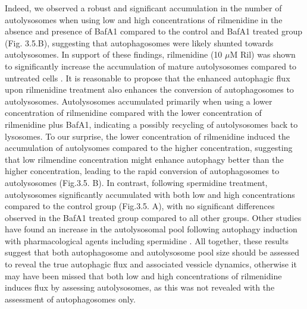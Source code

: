 {%
Indeed, we observed a robust and significant accumulation in the number of autolysosomes when using low and high concentrations of rilmenidine in the absence and presence of BafA1 compared to the control and BafA1 treated group (Fig. 3.5.B), suggesting that autophagosomes were likely shunted towards autolysosomes. In support of these findings,  rilmenidine (10 $\mu$M Ril) was shown to significantly increase the accumulation of mature autolysosomes compared to untreated cells \citep{Perera2018}. It is reasonable to propose that the enhanced autophagic flux upon rilmenidine treatment  also enhances the conversion of autophagosomes to autolysosomes. Autolysosomes accumulated primarily when using a lower concentration of rilmenidine compared with the lower concentration of rilmenidine plus BafA1, indicating a possibly recycling of autolysosomes back to lysosomes. To our surprise, the lower concentration of rilmenidine induced the accumulation of autolysomes compared to the higher concentration, suggesting that low rilmendine concentration might enhance autophagy better than the higher concentration, leading to the rapid conversion of autophagosomes to autolysosomes (Fig.3.5. B). In contrast, following spermidine treatment, autolysosomes significantly accumulated with both low and high concentrations compared to the control group (Fig.3.5. A), with no significant differences observed in the BafA1 treated group compared to all other groups. Other studies have found an increase in the autolysosomal pool following autophagy induction with pharmacological agents including spermidine \citep{DuToit2018a}. All together, these results suggest that both autophagosome and autolysosome pool size should be assessed to reveal the true autophagic flux and associated vessicle dynamics, otherwise it may have been missed that both low and high concentrations of rilmenidine induces flux by assessing autolysosomes, as this was not revealed with the assessment of autophagosomes only. 

}
